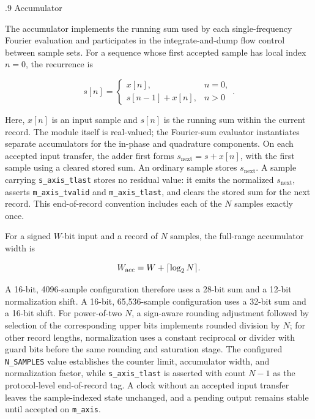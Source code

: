 %
%
\bigskip
{}
.9  \quad Accumulator

The accumulator implements the running sum used by each single-frequency Fourier evaluation and participates in the integrate-and-dump flow control between sample sets.  For a sequence whose first accepted sample has local index $n=0$, the recurrence is

\begin{equation}
s[n] = \left\{
       \begin{array}{ll}
         x[n],          & n=0, \\
         s[n-1]+x[n],   & n>0
      \end{array}
      \right.
      .
\end{equation}

\noindent Here, $x[n]$ is an input sample and $s[n]$ is the running sum within the current record.  The module itself is real-valued; the Fourier-sum evaluator instantiates separate accumulators for the in-phase and quadrature components.  On each accepted input transfer, the adder first forms $s_{\mathrm{next}}=s+x[n]$, with the first sample using a cleared stored sum.  An ordinary sample stores $s_{\mathrm{next}}$.  A sample carrying \texttt{s\_axis\_tlast} stores no residual value: it emits the normalized $s_{\mathrm{next}}$, asserts \texttt{m\_axis\_tvalid} and \texttt{m\_axis\_tlast}, and clears the stored sum for the next record.  This end-of-record convention includes each of the $N$ samples exactly once.

For a signed $W$-bit input and a record of $N$ samples, the full-range accumulator width is

\begin{equation*}
W_{\mathrm{acc}}=W+\lceil\log_2 N\rceil.
\end{equation*}

A 16-bit, 4096-sample configuration therefore uses a 28-bit sum and a 12-bit normalization shift.  A 16-bit, 65,536-sample configuration uses a 32-bit sum and a 16-bit shift.  For power-of-two $N$, a sign-aware rounding adjustment followed by selection of the corresponding upper bits implements rounded division by $N$; for other record lengths, normalization uses a constant reciprocal or divider with guard bits before the same rounding and saturation stage.  The configured \texttt{N\_SAMPLES} value establishes the counter limit, accumulator width, and normalization factor, while \texttt{s\_axis\_tlast} is asserted with count $N-1$ as the protocol-level end-of-record tag.  A clock without an accepted input transfer leaves the sample-indexed state unchanged, and a pending output remains stable until accepted on \texttt{m\_axis}.

